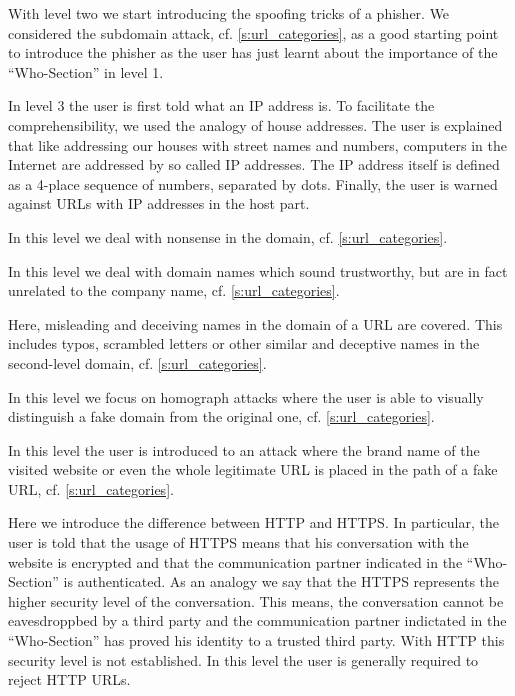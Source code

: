\begin{description}[leftmargin=0cm]
	\item[Level 2] With level two we start introducing the spoofing tricks of a phisher.
 We considered the subdomain attack, cf. \autoref{s:url_categories}, as a good starting point to introduce the phisher as the user has just learnt about the importance of the ``Who-Section'' in level 1.
	\item[Level 3] In level 3 the user is first told what an IP address is.
 To facilitate the comprehensibility, we used the analogy of house addresses.
 The user is explained that like addressing our houses with street names and numbers, computers in the Internet are addressed by so called IP addresses.
 The IP address itself is defined as a 4-place sequence of numbers, separated by dots.
 Finally, the user is warned against URLs with IP addresses in the host part.
	\item[Level 4] In this level we deal with nonsense in the domain, cf. \autoref{s:url_categories}.
	\item[Level 5] In this level we deal with domain names which sound trustworthy, but are in fact unrelated to the company name, cf. \autoref{s:url_categories}.
	\item[Level 6] Here, misleading and deceiving names in the domain of a URL are covered.
 This includes typos, scrambled letters or other similar and deceptive names in the second-level domain, cf. \autoref{s:url_categories}.
	\item[Level 7] In this level we focus on homograph attacks where the user is able to visually distinguish a fake domain from the original one, cf. \autoref{s:url_categories}.
	\item[Level 8] In this level the user is introduced to an attack where the brand name of the visited website or even the whole legitimate URL is placed in the path of a fake URL, cf. \autoref{s:url_categories}.
	\item[Level 9] Here we introduce the difference between HTTP and HTTPS. In particular, the user is told that the usage of HTTPS means that his conversation with the website is encrypted and that the communication partner indicated in the ``Who-Section'' is authenticated.
 As an analogy we say that the HTTPS represents the higher security level of the conversation.
 This means, the conversation cannot be eavesdroppbed by a third party and the communication partner indictated in the ``Who-Section'' has proved his identity to a trusted third party.
 With HTTP this security level is not established.
In this level the user is generally required to reject HTTP URLs.

\end{description}
